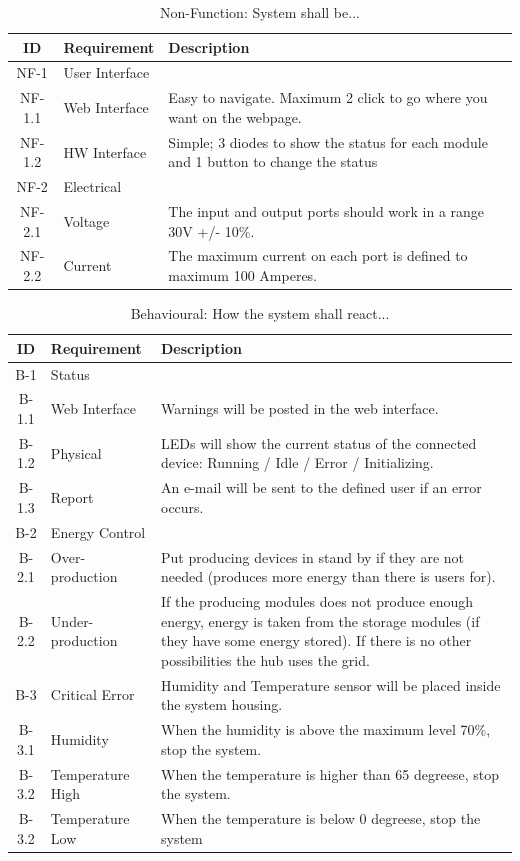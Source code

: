		\begin{table}[H]
			\begin{tabular} [b] {| c |  p{3cm} | p{10cm} |}
			\hline
			\textbf{ID} & \textbf{Requirement} & \textbf{Description} \\\hline
			NF-1 & User Interface 	&  \\ \hline
			NF-1.1 & Web Interface 	& Easy to navigate. Maximum 2 click to go where you want on the webpage. \\ \hline
			NF-1.2 & HW Interface 	& Simple; 3 diodes to show the status for each module and 1 button to change the status \\ \hline
			NF-2 & Electrical 		&  \\ \hline
			NF-2.1 & Voltage 		& The input and output ports should work in a range 30V +/-  10\%.\\ \hline
			NF-2.2 & Current 		& The maximum current on each port is defined to maximum 100 Amperes. \\ \hline
		\end{tabular}
		\caption{Non-Function: System shall be...}
		\end{table}

		\begin{table}[H]
			\begin{tabular} [b] {| c |  p{3cm} | p{10cm} |}
			\hline
			\textbf{ID} & \textbf{Requirement} & \textbf{Description} \\\hline
			B-1 & Status &  \\\hline
			B-1.1 & Web Interface 	 & Warnings will be posted in the web interface. \\\hline
			B-1.2 & Physical 		 & LEDs will show the current status of the connected device: Running / Idle / Error / Initializing. \\\hline
			B-1.3 & Report 			 & An e-mail will be sent to the defined user if an error occurs. \\\hline
			B-2 & Energy Control 	 &  \\\hline
			B-2.1 & Over-production 	 & Put producing devices in stand by if they are not needed (produces more energy than there is users for). \\\hline
			B-2.2 & Under-production  & If the producing modules does not produce enough energy, energy is taken from the storage
				      modules (if they have some energy stored). If there is no other possibilities the hub uses the grid. \\\hline
			B-3 & Critical Error 		& Humidity and Temperature sensor will be placed inside the system housing. \\\hline
			B-3.1 & Humidity 		 & When the humidity is above the maximum level 70\%, stop the system. \\\hline
			B-3.2 & Temperature High& When the temperature is higher than 65 degreese,  stop the system.\\\hline
			B-3.2 & Temperature Low & When the temperature is below 0 degreese, stop the system\\\hline
		\end{tabular}
		\caption{Behavioural: How the system shall react...}
		\end{table}
		
